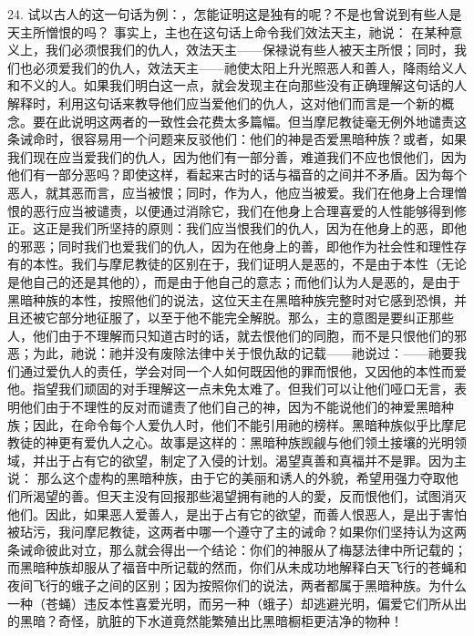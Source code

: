 24. 试以古人的这一句话为例：，怎能证明这是独有的呢？不是也曾说到有些人是天主所憎恨的吗？ 事实上，主也在这句话上命令我们效法天主，祂说： 在某种意义上，我们必须恨我们的仇人，效法天主——保禄说有些人被天主所恨；同时，我们也必须爱我们的仇人，效法天主——祂使太阳上升光照恶人和善人，降雨给义人和不义的人。如果我们明白这一点，就会发现主在向那些没有正确理解这句话的人解释时，利用这句话来教导他们应当爱他们的仇人，这对他们而言是一个新的概念。要在此说明这两者的一致性会花费太多篇幅。但当摩尼教徒毫无例外地谴责这条诫命时，很容易用一个问题来反驳他们：他们的神是否爱黑暗种族？或者，如果我们现在应当爱我们的仇人，因为他们有一部分善，难道我们不应也恨他们，因为他们有一部分恶吗？即使这样，看起来古时的话与福音的之间并不矛盾。因为每个恶人，就其恶而言，应当被恨；同时，作为人，他应当被爱。我们在他身上合理憎恨的恶行应当被谴责，以便通过消除它，我们在他身上合理喜爱的人性能够得到修正。这正是我们所坚持的原则：我们应当恨我们的仇人，因为在他身上的恶，即他的邪恶；同时我们也爱我们的仇人，因为在他身上的善，即他作为社会性和理性存有的本性。我们与摩尼教徒的区别在于，我们证明人是恶的，不是由于本性（无论是他自己的还是其他的），而是由于他自己的意志；而他们认为人是恶的，是由于黑暗种族的本性，按照他们的说法，这位天主在黑暗种族完整时对它感到恐惧，并且还被它部分地征服了，以至于他不能完全解脱。那么，主的意图是要纠正那些人，他们由于不理解而只知道古时的话，就去恨他们的同胞，而不是只恨他们的邪恶；为此，祂说：祂并没有废除法律中关于恨仇敌的记载——祂说过：——祂要我们通过爱仇人的责任，学会对同一个人如何既因他的罪而恨他，又因他的本性而爱他。指望我们顽固的对手理解这一点未免太难了。但我们可以让他们哑口无言，表明他们由于不理性的反对而谴责了他们自己的神，因为不能说他们的神爱黑暗种族；因此，在命令每个人爱仇人时，他们不能引用祂的榜样。黑暗种族似乎比摩尼教徒的神更有爱仇人之心。故事是这样的：黑暗种族觊觎与他们领土接壤的光明领域，并出于占有它的欲望，制定了入侵的计划。渴望真善和真福并不是罪。因为主说： 那么这个虚构的黑暗种族，由于它的美丽和诱人的外貌，希望用强力夺取他们所渴望的善。但天主没有回报那些渴望拥有祂的人的愛，反而恨他们，试图消灭他们。因此，如果恶人爱善人，是出于占有它的欲望，而善人恨恶人，是出于害怕被玷污，我问摩尼教徒，这两者中哪一个遵守了主的诫命？如果你们坚持认为这两条诫命彼此对立，那么就会得出一个结论：你们的神服从了梅瑟法律中所记载的；而黑暗种族却服从了福音中所记载的然而，你们从未成功地解释白天飞行的苍蝇和夜间飞行的蛾子之间的区别；因为按照你们的说法，两者都属于黑暗种族。为什么一种（苍蝇）违反本性喜爱光明，而另一种（蛾子）却逃避光明，偏爱它们所从出的黑暗？奇怪，肮脏的下水道竟然能繁殖出比黑暗橱柜更洁净的物种！\par

